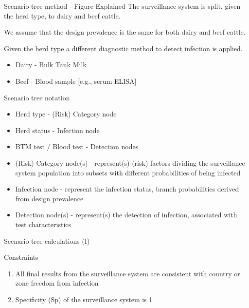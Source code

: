 \documentclass[
  ignorenonframetext,
]{beamer}
\providecommand{\tightlist}{%
  \setlength{\itemsep}{0pt}\setlength{\parskip}{0pt}}
\begin{document}
\begin{frame}{Scenario tree method - Figure Explained}
\protect\hypertarget{scenario-tree-method---figure-explained}{}
The surveillance system is split, given the herd type, to dairy and beef
cattle.

We assume that the design prevalence is the same for both dairy and beef
cattle.

Given the herd type a different diagnostic method to detect infection is
applied.

\begin{itemize}
\item Dairy - Bulk Tank Milk
\item Beef - Blood  sample [e.g., serum ELISA]
\end{itemize}
\end{frame}

\begin{frame}{Scenario tree notation}
\protect\hypertarget{scenario-tree-notation}{}
\begin{itemize}
\tightlist
\item
  Herd type - (Risk) Category node
\item
  Herd status - Infection node
\item
  BTM test / Blood test - Detection nodes
\end{itemize}

\vspace{1cm}

\begin{itemize}
\tightlist
\item
  (Risk) Category node(s) - represent(s) (risk) factors dividing the
  surveillance system population into subsets with different
  probabilities of being infected
\item
  Infection node - represent the infection status, branch probabilities
  derived from design prevalence
\item
  Detection node(s) - represent(s) the detection of infection,
  associated with test characteristics
\end{itemize}
\end{frame}

\begin{frame}{Scenario tree calculations (I)}
\protect\hypertarget{scenario-tree-calculations-i}{}
\begin{block}{Constraints}
\protect\hypertarget{constraints}{}
\begin{enumerate}
\item All final results from the surveillance system are consistent with country or zone freedom from infection
\item Specificity (Sp) of the surveillance system is 1 
\end{enumerate}
\end{block}
\end{frame}
\end{document}
